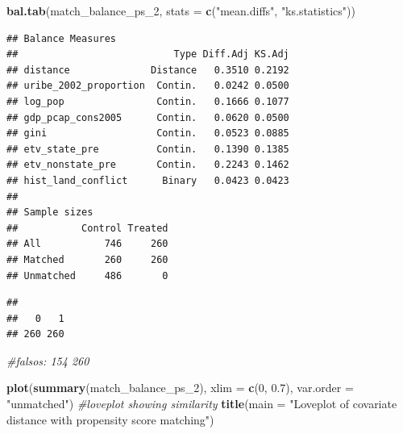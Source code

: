 \documentclass[
]{article}
\newenvironment{Shaded}{\begin{snugshade}}{\end{snugshade}}
\newcommand{\AttributeTok}[1]{\textcolor[rgb]{0.13,0.29,0.53}{#1}}
\newcommand{\CommentTok}[1]{\textcolor[rgb]{0.56,0.35,0.01}{\textit{#1}}}
\newcommand{\DecValTok}[1]{\textcolor[rgb]{0.00,0.00,0.81}{#1}}
\newcommand{\FloatTok}[1]{\textcolor[rgb]{0.00,0.00,0.81}{#1}}
\newcommand{\FunctionTok}[1]{\textcolor[rgb]{0.13,0.29,0.53}{\textbf{#1}}}
\newcommand{\NormalTok}[1]{#1}
\newcommand{\OtherTok}[1]{\textcolor[rgb]{0.56,0.35,0.01}{#1}}
\newcommand{\SpecialCharTok}[1]{\textcolor[rgb]{0.81,0.36,0.00}{\textbf{#1}}}
\newcommand{\StringTok}[1]{\textcolor[rgb]{0.31,0.60,0.02}{#1}}
\begin{document}
\begin{Shaded}
\begin{Highlighting}[]
\FunctionTok{bal.tab}\NormalTok{(match\_balance\_ps\_2, }\AttributeTok{stats =} \FunctionTok{c}\NormalTok{(}\StringTok{"mean.diffs"}\NormalTok{, }\StringTok{"ks.statistics"}\NormalTok{))}
\end{Highlighting}
\end{Shaded}

\begin{verbatim}
## Balance Measures
##                           Type Diff.Adj KS.Adj
## distance              Distance   0.3510 0.2192
## uribe_2002_proportion  Contin.   0.0242 0.0500
## log_pop                Contin.   0.1666 0.1077
## gdp_pcap_cons2005      Contin.   0.0620 0.0500
## gini                   Contin.   0.0523 0.0885
## etv_state_pre          Contin.   0.1390 0.1385
## etv_nonstate_pre       Contin.   0.2243 0.1462
## hist_land_conflict      Binary   0.0423 0.0423
## 
## Sample sizes
##           Control Treated
## All           746     260
## Matched       260     260
## Unmatched     486       0
\end{verbatim}

\begin{Shaded}
\end{Shaded}

\begin{verbatim}
## 
##   0   1 
## 260 260
\end{verbatim}

\begin{Shaded}
\begin{Highlighting}[]
\CommentTok{\#falsos: 154 260 }


\FunctionTok{plot}\NormalTok{(}\FunctionTok{summary}\NormalTok{(match\_balance\_ps\_2), }\AttributeTok{xlim =} \FunctionTok{c}\NormalTok{(}\DecValTok{0}\NormalTok{, }\FloatTok{0.7}\NormalTok{), }\AttributeTok{var.order =} \StringTok{"unmatched"}\NormalTok{) }\CommentTok{\#loveplot showing similarity}
\FunctionTok{title}\NormalTok{(}\AttributeTok{main =} \StringTok{"Loveplot of covariate distance with propensity score matching"}\NormalTok{)}
\end{Highlighting}
\end{Shaded}
\end{document}
